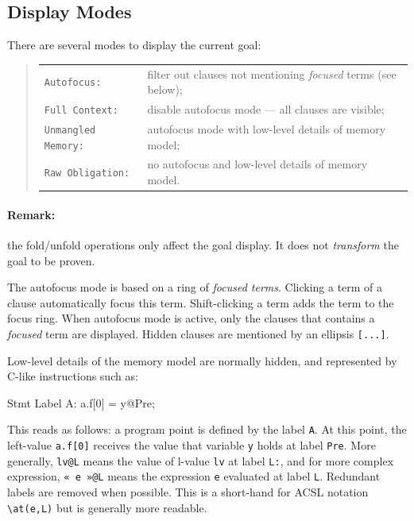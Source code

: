 \subsection{Display Modes}

There are several modes to display the current goal:
\begin{quote}
\begin{tabular}{ll}
\verb+Autofocus:+ & filter out clauses not mentioning \emph{focused} terms (see below);\\
\verb+Full Context:+ & disable autofocus mode --- all clauses are visible; \\
\verb+Unmangled Memory:+ & autofocus mode with low-level details of memory model; \\
\verb+Raw Obligation:+ & no autofocus and low-level details of memory model.
\end{tabular}
\end{quote}

\paragraph{Remark:} the fold/unfold operations only affect the goal display. It does not \emph{transform} the goal to be proven.

The autofocus mode is based on a ring of \emph{focused terms}. Clicking a term of a clause automatically focus this term. Shift-clicking a term adds the term to the focus ring. When autofocus mode is active, only the clauses that contains a \emph{focused} term are displayed. Hidden clauses are mentioned by an ellipsis \texttt{[...]}.

Low-level details of the memory model are normally hidden, and represented by C-like instructions such as:

\begin{ccode}
   Stmt { Label A: a.f[0] = y@Pre; }
\end{ccode}

This reads as follows: a program point is defined by the label \texttt{A}. At this point, the left-value \texttt{a.f[0]} receives the value that variable \texttt{y} holds at label \texttt{Pre}. More generally, \texttt{lv@L} means the value of l-value \texttt{lv} at label \texttt{L:}, and for more complex expression, \texttt{« e »@L} means the expression \texttt{e} evaluated at label \texttt{L}. Redundant labels are removed when possible. This is a short-hand for \textsf{ACSL} notation \lstinline{\at(e,L)} but is generally more readable.

